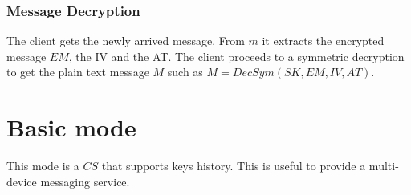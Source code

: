 \documentclass[a4paper,10pt]{article}
\begin{document}
\subsubsection{Message Decryption}
The client gets the newly arrived message. From $m$ it extracts the encrypted message $EM$, the IV and the AT. The client proceeds to a symmetric decryption to get the plain text message $M$ such as $M=DecSym(SK, EM, IV, AT)$.

\section{Basic mode}
This mode is a $CS$ that supports keys history. This is useful to provide a multi-device messaging service.
\subsection{}
\end{document}
